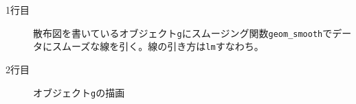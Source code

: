 \begin{description}
	\item[1行目] 散布図を書いているオブジェクト\texttt{g}にスムージング関数\verb|geom_smooth|でデータにスムーズな線を引く。線の引き方は\texttt{lm}すなわち。
	\item[2行目] オブジェクト\texttt{g}の描画
\end{description}
